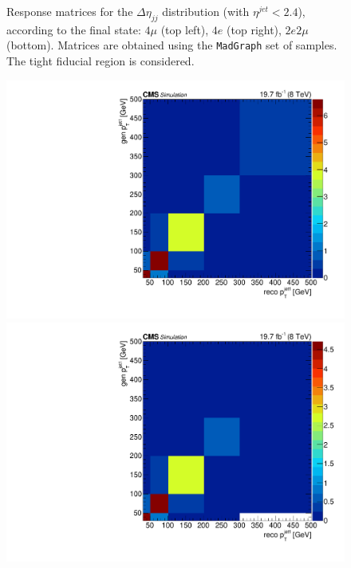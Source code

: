 \begin{figure}[hbtp]
\begin{center}
    \caption{Response matrices for the $\Delta\eta_{jj}$ distribution (with $\eta^{jet}<2.4$), according to the final state:  $4\mu$ (top left), $4e$ (top right), $2e2\mu$  (bottom). Matrices are obtained using the  \texttt{MadGraph} set of samples. The tight fiducial region is considered.} 
    \label{fig:CentralDeta_matrices}
  \end{center}
\end{figure}
\begin{figure}[hbtp]
  \begin{center}
    \includegraphics[width=\cmsFigWidth]{Figures/ResMat_qqggJJ_PtJet1_ZZTo4m_st_01_fr_Mad}
    \includegraphics[width=\cmsFigWidth]{Figures/ResMat_qqggJJ_PtJet1_ZZTo4e_st_01_fr_Mad}

\end{center}
\end{figure}
